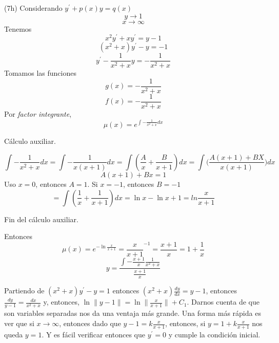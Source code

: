 \begin{exercise}
(7h) Considerando $y^{\prime} + p(x)y = q(x)$
$$y \longrightarrow 1$$
$$x \longrightarrow \infty$$
Tenemos
$$x^{2}y^{\prime} + xy^{\prime} = y - 1$$
$$(x^2 + x)y^{\prime} - y = -1$$
$$y^{\prime} - \frac{1}{x^2 + x}y = - \frac{1}{x^2 + x}$$
Tomamos las funciones
$$g(x) = - \frac{1}{x^2 + x}$$
$$f(x) = - \frac{1}{x^2 + x}$$
Por \emph{factor integrante},
$$\mu(x) = e ^{\int{- \frac{1}{x^2 + x}dx}}$$

C\'alculo auxiliar.

$$
{\int{- \frac{1}{x^2 + x}dx}} = 
{\int{- \frac{1}{x(x + 1)}dx}} =
{\int{(\frac{A}{x} + \frac{B}{x+1})dx}} =
{\int{(\frac{A(x+1) + BX}{x(x+1)}})dx}
$$
$$
A(x+1) + Bx = 1 
$$
Uso $x = 0$, entonces $A = 1$. Si $x = -1$, entonces $B = -1$
$$
={\int{(\frac{1}{x} + \frac{1}{x+1})dx}}
=\ln{x}-\ln{x+1}=ln{\frac{x}{x+1}}
$$

Fin del c\'alculo auxiliar.

Entonces
$$
\mu(x)=e^{-\ln{\frac{x}{x+1}}} = \frac{x}{x+1}^{-1} = \frac{x+1}{x} = 1 + \frac{1}{x}
$$
$$
y = \frac{\int{-\frac{x+1}{x} \frac{1}{x^2 + x}}}{\frac{x+1}{x}}
$$

Partiendo de $(x^2 + x)y^{\prime} - y = 1$ entonces $(x^2 + x)\frac{dy}{dx} = y - 1$, entonces $\frac{dy}{y-1} = \frac{dx}{x^2 + x}$ y, entonces, $\ln{\|y-1\|} = \ln{\|\frac{x}{x+1}\|} + C_1$. Darnos cuenta de que son variables separadas nos da una ventaja m\'as grande. Una forma m\'as r\'apida es ver que si $x\longrightarrow \infty$, entonces dado que $y - 1 = k\frac{x}{x+1}$, entonces, si $y = 1 + k\frac{x}{x+1}$ nos queda $y = 1$. Y es f\'acil verificar entonces que $y^{\prime} = 0$ y cumple la condici\'on inicial.

\end{exercise}

